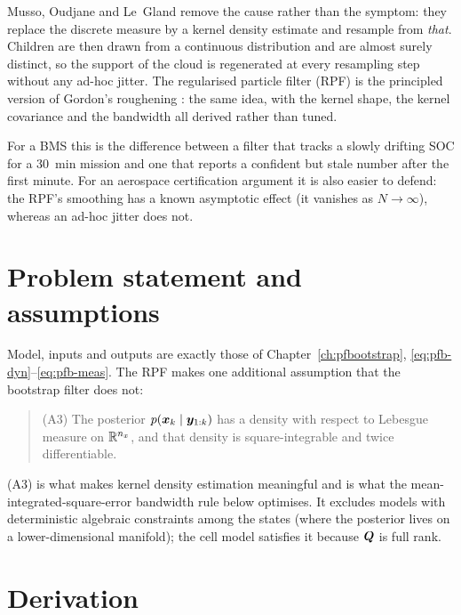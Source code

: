 Musso, Oudjane and Le~Gland \cite{musso2001regularized} remove the cause rather than the symptom:
they replace the discrete measure by a kernel density estimate and resample from \emph{that}.
Children are then drawn from a continuous distribution and are almost surely distinct, so the
support of the cloud is regenerated at every resampling step without any ad-hoc jitter.  The
regularised particle filter (RPF) is the principled version of Gordon's roughening
\cite[\S4.2]{gordon1993}: the same idea, with the kernel shape, the kernel covariance and the
bandwidth all derived rather than tuned.

For a BMS this is the difference between a filter that tracks a slowly drifting SOC for a
\SI{30}{\minute} mission and one that reports a confident but stale number after the first minute.
For an aerospace certification argument it is also easier to defend: the RPF's smoothing has a
known asymptotic effect (it vanishes as $N\to\infty$), whereas an ad-hoc jitter does not.

\section{Problem statement and assumptions}
Model, inputs and outputs are exactly those of Chapter~\ref{ch:pfbootstrap},
\eqref{eq:pfb-dyn}--\eqref{eq:pfb-meas}.  The RPF makes one additional assumption that the
bootstrap filter does not:
\begin{quote}
(A3) The posterior $p(\bm{x}_k\mid\bm{y}_{1:k})$ has a density with respect to Lebesgue measure on
$\mathbb{R}^{n_x}$, and that density is square-integrable and twice differentiable.
\end{quote}
(A3) is what makes kernel density estimation meaningful and is what the mean-integrated-square-error
bandwidth rule below optimises.  It excludes models with deterministic algebraic constraints among
the states (where the posterior lives on a lower-dimensional manifold); the cell model satisfies it
because $\bm{Q}$ is full rank.

\section{Derivation}

